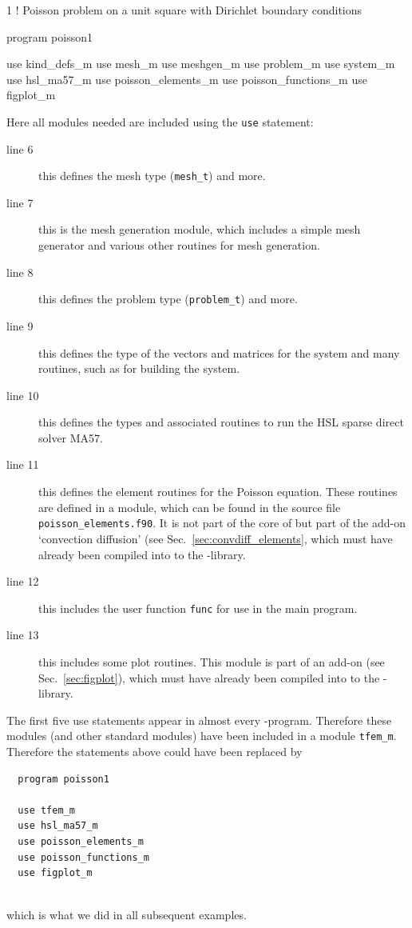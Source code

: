 \begin{listing}{1}
! Poisson problem on a unit square with Dirichlet boundary conditions

program poisson1

  use kind_defs_m
  use mesh_m
  use meshgen_m
  use problem_m
  use system_m
  use hsl_ma57_m
  use poisson_elements_m
  use poisson_functions_m
  use figplot_m

\end{listing}
Here all modules needed are included using the \texttt{use} statement:
\begin{description}
   \item[line 6] this defines the mesh type (\texttt{mesh\_t}) and more.
   \item[line 7] this is the mesh generation module, which includes a simple
                 mesh generator and various other routines for mesh generation.
   \item[line 8] this defines the problem type (\texttt{problem\_t}) and more.
   \item[line 9] this defines the type of the
                 vectors and matrices for the system and many
                 routines, such as for building the system.
   \item[line 10] this defines the types and associated routines to run the HSL
                  sparse direct solver MA57.
   \item[line 11] this defines the element routines for the Poisson equation.
                  These routines are defined in a module, which can be found in
                  the source file 
                  \texttt{poisson\_elements.f90}. It is
                  not part of the core of \tfem but part of the add-on 
                  `convection diffusion' (see Sec.~\ref{sec:convdiff_elements},
                   which must
                  have already been compiled into to the \tfem-library.
   \item[line 12] this includes the user function \texttt{func} for use in the main program.
   \item[line 13] this includes some plot routines.
                  This module is part of an add-on
                  (see Sec.~\ref{sec:figplot}), which must
                  have already been compiled into to the \tfem-library.
\end{description}
The first five use statements appear in almost every \tfem-program. Therefore
these modules (and other standard modules) have been included in a module
\texttt{tfem\_m}. Therefore the statements above could have been replaced by
\begin{verbatim}
  program poisson1

  use tfem_m
  use hsl_ma57_m
  use poisson_elements_m
  use poisson_functions_m
  use figplot_m
 
\end{verbatim}
which is what we did in all subsequent examples.

